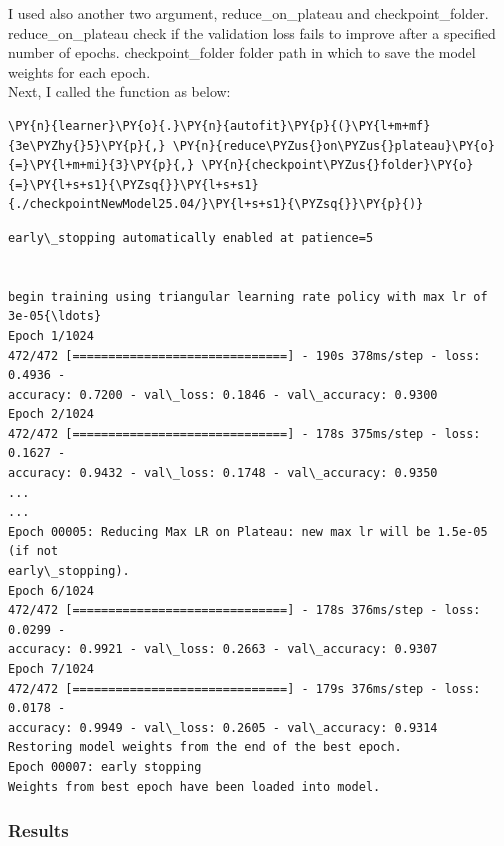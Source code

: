 I used also another two argument, reduce\_on\_plateau and checkpoint\_folder.\\
reduce\_on\_plateau check if the validation loss fails to improve after a specified number of epochs.
checkpoint\_folder folder path in which to save the model weights for each epoch.\\
Next, I called the function as below:
    \begin{tcolorbox}[breakable, size=fbox, boxrule=1pt, pad at break*=1mm,colback=cellbackground, colframe=cellborder]
\begin{Verbatim}[commandchars=\\\{\},fontsize=\footnotesize]
\PY{n}{learner}\PY{o}{.}\PY{n}{autofit}\PY{p}{(}\PY{l+m+mf}{3e\PYZhy{}5}\PY{p}{,} \PY{n}{reduce\PYZus{}on\PYZus{}plateau}\PY{o}{=}\PY{l+m+mi}{3}\PY{p}{,} \PY{n}{checkpoint\PYZus{}folder}\PY{o}{=}\PY{l+s+s1}{\PYZsq{}}\PY{l+s+s1}{./checkpointNewModel25.04/}\PY{l+s+s1}{\PYZsq{}}\PY{p}{)}
\end{Verbatim}
\end{tcolorbox}


  \begin{Verbatim}[commandchars=\\\{\},fontsize=\footnotesize]
early\_stopping automatically enabled at patience=5


begin training using triangular learning rate policy with max lr of 3e-05{\ldots}
Epoch 1/1024
472/472 [==============================] - 190s 378ms/step - loss: 0.4936 -
accuracy: 0.7200 - val\_loss: 0.1846 - val\_accuracy: 0.9300
Epoch 2/1024
472/472 [==============================] - 178s 375ms/step - loss: 0.1627 -
accuracy: 0.9432 - val\_loss: 0.1748 - val\_accuracy: 0.9350
...
...
Epoch 00005: Reducing Max LR on Plateau: new max lr will be 1.5e-05 (if not
early\_stopping).
Epoch 6/1024
472/472 [==============================] - 178s 376ms/step - loss: 0.0299 -
accuracy: 0.9921 - val\_loss: 0.2663 - val\_accuracy: 0.9307
Epoch 7/1024
472/472 [==============================] - 179s 376ms/step - loss: 0.0178 -
accuracy: 0.9949 - val\_loss: 0.2605 - val\_accuracy: 0.9314
Restoring model weights from the end of the best epoch.
Epoch 00007: early stopping
Weights from best epoch have been loaded into model.
    \end{Verbatim}
    
\subsubsection{Results}
